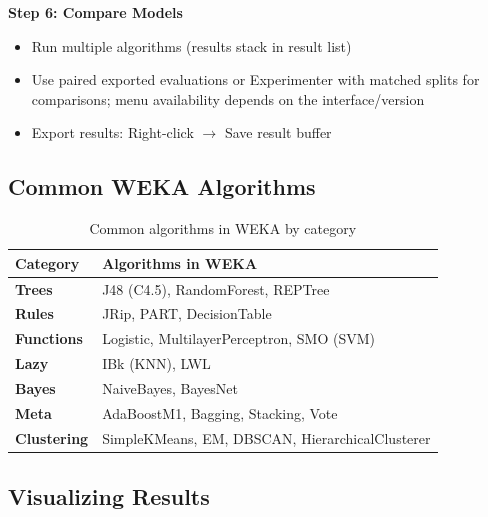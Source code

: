\documentclass[11pt,twoside]{article}
\numberwithin{equation}{section}
\theoremstyle{plain}
\theoremstyle{definition}
\theoremstyle{remark}
\begin{document}
\begin{algorithmbox}
\textbf{Step 6: Compare Models}
\begin{itemize}
\item Run multiple algorithms (results stack in result list)
\item Use paired exported evaluations or Experimenter with matched splits for comparisons; menu availability depends on the interface/version
\item Export results: Right-click $\to$ Save result buffer
\end{itemize}
\end{algorithmbox}

\subsection{Common WEKA Algorithms}

\begin{table}[H]
\centering
\begin{tabular}{@{}ll@{}}
\toprule
\textbf{Category} & \textbf{Algorithms in WEKA} \\
\midrule
\textbf{Trees} & J48 (C4.5), RandomForest, REPTree \\
\textbf{Rules} & JRip, PART, DecisionTable \\
\textbf{Functions} & Logistic, MultilayerPerceptron, SMO (SVM) \\
\textbf{Lazy} & IBk (KNN), LWL \\
\textbf{Bayes} & NaiveBayes, BayesNet \\
\textbf{Meta} & AdaBoostM1, Bagging, Stacking, Vote \\
\textbf{Clustering} & SimpleKMeans, EM, DBSCAN, HierarchicalClusterer \\
\bottomrule
\end{tabular}
\caption{Common algorithms in WEKA by category}
\end{table}

\subsection{Visualizing Results}
\end{document}
